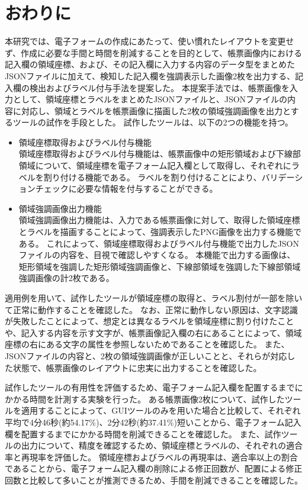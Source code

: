 \chapter{おわりに}\label{cha:Conclusion}
本研究では、電子フォームの作成にあたって、使い慣れたレイアウトを変更せず、作成に必要な手間と時間を削減することを目的として、帳票画像内における記入欄の領域座標、および、その記入欄に入力する内容のデータ型をまとめたJSONファイルに加えて、検知した記入欄を強調表示した画像2枚を出力する、記入欄の検出およびラベル付与手法を提案した。
本提案手法では、帳票画像を入力として、領域座標とラベルをまとめたJSONファイルと、JSONファイルの内容に対応し、領域とラベルを帳票画像に描画した2枚の領域強調画像を出力とするツールの試作を手段とした。
試作したツールは、以下の2つの機能を持つ。

\begin{itemize}
  \item 領域座標取得およびラベル付与機能\\
      領域座標取得およびラベル付与機能は、帳票画像中の矩形領域および下線部領域について、領域座標を電子フォーム記入欄として取得し、それぞれにラベルを割り付ける機能である。
      ラベルを割り付けることにより、バリデーションチェックに必要な情報を付与することができる。
  \item 領域強調画像出力機能\\
      領域強調画像出力機能は、入力である帳票画像に対して、取得した領域座標とラベルを描画することによって、強調表示したPNG画像を出力する機能である。
      これによって、領域座標取得およびラベル付与機能で出力したJSONファイルの内容を、目視で確認しやすくなる。
      本機能で出力する画像は、矩形領域を強調した矩形領域強調画像と、下線部領域を強調した下線部領域強調画像の計2枚である。
\end{itemize}

適用例を用いて、試作したツールが領域座標の取得と、ラベル割付が一部を除いて正常に動作することを確認した。
なお、正常に動作しない原因は、文字認識が失敗したことによって、想定とは異なるラベルを領域座標に割り付けたことや、記入する内容を示す文字が、帳票画像記入欄の右にあることによって、領域座標の右にある文字の属性を参照しないためであることを確認した。
また、JSONファイルの内容と、2枚の領域強調画像が正しいことと、それらが対応した状態で、帳票画像のレイアウトに忠実に出力することを確認した。

試作したツールの有用性を評価するため、電子フォーム記入欄を配置するまでにかかる時間を計測する実験を行った。
ある帳票画像2枚について、試作したツールを適用することによって、GUIツールのみを用いた場合と比較して、それぞれ平均で4分46秒(約54.17\%)、2分42秒(約37.41\%)短いことから、電子フォーム記入欄を配置するまでにかかる時間を削減できることを確認した。
また、試作ツールの出力について、精度を確認するため、領域座標とラベルの、それぞれの適合率と再現率を評価した。
領域座標およびラベルの再現率は、適合率以上の割合であることから、電子フォーム記入欄の削除による修正回数が、配置による修正回数と比較して多いことが推測できるため、手間を削減できることを確認した。

